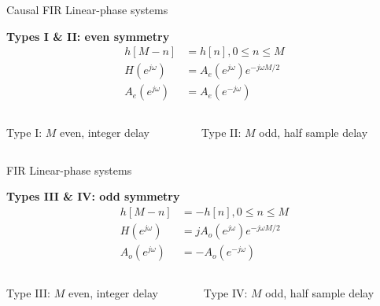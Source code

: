\documentclass[10pt, aspectratio=169]{beamer}
\begin{document}
\begin{frame}{Causal FIR Linear-phase systems}

\textbf{Types I \& II: even symmetry}
\begin{align}
h[M-n] &= h[n], 0 \leq n \leq M \tag{even symmetry} \\
H(e^{j\omega}) &= A_e(e^{j\omega})e^{-j\omega M/2} \tag{Delay of $M/2$} \\
A_e(e^{j\omega}) &= A_e(e^{-j\omega}) \tag{due to even symmetry}
\end{align}

\begin{columns}
	\begin{column}{0.5\textwidth}
		Type I: $M$ even, integer delay
	\end{column}
	\begin{column}{0.5\textwidth}
		Type II: $M$ odd, half sample delay
	\end{column}
\end{columns}

\begin{center}
	\resizebox{\linewidth}{!}{}
\end{center}

\end{frame}

\begin{frame}{FIR Linear-phase systems}

\textbf{Types III \& IV: odd symmetry}
\begin{align}
h[M-n] &= -h[n], 0 \leq n \leq M \tag{odd symmetry} \\
H(e^{j\omega}) &= jA_o(e^{j\omega})e^{-j\omega M/2} \tag{Delay of $M/2$} \\
A_o(e^{j\omega}) &= -A_o(e^{-j\omega}) \tag{due to odd symmetry}
\end{align}

\begin{columns}
	\begin{column}{0.5\textwidth}
		Type III: $M$ even, integer delay
	\end{column}
	\begin{column}{0.5\textwidth}
		Type IV: $M$ odd, half sample delay
	\end{column}
\end{columns}

\begin{center}
	\resizebox{0.9\linewidth}{!}{}
\end{center}

\end{frame}
\end{document}
